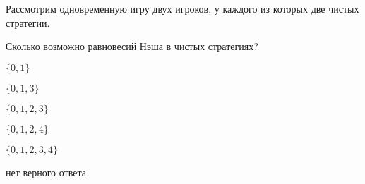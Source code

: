 
\begin{question}
Рассмотрим одновременную игру двух игроков, у каждого из которых две чистых стратегии.

Сколько возможно равновесий Нэша в чистых стратегиях?
\begin{answerlist}
  \item \(\{0, 1\}\)
  \item \(\{0, 1, 3 \}\)
  \item \(\{0, 1, 2, 3\}\)
  \item \(\{0, 1, 2, 4\}\)
  \item \(\{0, 1, 2, 3, 4\}\)
  \item нет верного ответа
\end{answerlist}
\end{question}


